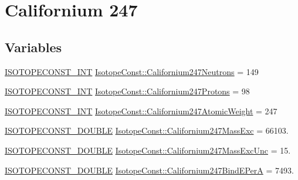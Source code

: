 \hypertarget{group___isotope_const-_californium-_cf247}{}\section{Californium 247}
\label{group___isotope_const-_californium-_cf247}
\subsection*{Variables}
\begin{DoxyCompactItemize}
\item 
\mbox{\hyperlink{group___isotope_const-_macros_ga5f18360b3e99483a35c32d789e62621c}{I\+S\+O\+T\+O\+P\+E\+C\+O\+N\+S\+T\+\_\+\+I\+NT}} \mbox{\hyperlink{group___isotope_const-_californium-_cf247_gaaa55385f219df35dae20f708193e9ab5}{Isotope\+Const\+::\+Californium247\+Neutrons}} = 149
\item 
\mbox{\hyperlink{group___isotope_const-_macros_ga5f18360b3e99483a35c32d789e62621c}{I\+S\+O\+T\+O\+P\+E\+C\+O\+N\+S\+T\+\_\+\+I\+NT}} \mbox{\hyperlink{group___isotope_const-_californium-_cf247_ga778bf1b38cfa5337ee620b497ceb0435}{Isotope\+Const\+::\+Californium247\+Protons}} = 98
\item 
\mbox{\hyperlink{group___isotope_const-_macros_ga5f18360b3e99483a35c32d789e62621c}{I\+S\+O\+T\+O\+P\+E\+C\+O\+N\+S\+T\+\_\+\+I\+NT}} \mbox{\hyperlink{group___isotope_const-_californium-_cf247_gaaa6cf36c4e5fc2678ded77fc4bdba1b9}{Isotope\+Const\+::\+Californium247\+Atomic\+Weight}} = 247
\item 
\mbox{\hyperlink{group___isotope_const-_macros_ga8f45a7272ce02c0b4c65c44636ed719a}{I\+S\+O\+T\+O\+P\+E\+C\+O\+N\+S\+T\+\_\+\+D\+O\+U\+B\+LE}} \mbox{\hyperlink{group___isotope_const-_californium-_cf247_ga35a2ee267f23f7c5a746d2d65b7d69c2}{Isotope\+Const\+::\+Californium247\+Mass\+Exc}} = 66103.
\item 
\mbox{\hyperlink{group___isotope_const-_macros_ga8f45a7272ce02c0b4c65c44636ed719a}{I\+S\+O\+T\+O\+P\+E\+C\+O\+N\+S\+T\+\_\+\+D\+O\+U\+B\+LE}} \mbox{\hyperlink{group___isotope_const-_californium-_cf247_ga9f158e69fbfa909a2ad0833927c2bb5e}{Isotope\+Const\+::\+Californium247\+Mass\+Exc\+Unc}} = 15.
\item 
\mbox{\hyperlink{group___isotope_const-_macros_ga8f45a7272ce02c0b4c65c44636ed719a}{I\+S\+O\+T\+O\+P\+E\+C\+O\+N\+S\+T\+\_\+\+D\+O\+U\+B\+LE}} \mbox{\hyperlink{group___isotope_const-_californium-_cf247_gabb6d677cf72ad67423b205986e6d15f8}{Isotope\+Const\+::\+Californium247\+Bind\+E\+PerA}} = 7493.

\end{DoxyCompactItemize}
